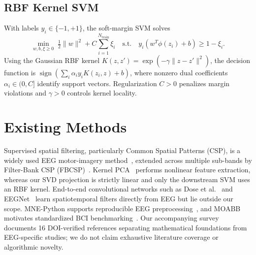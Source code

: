 \documentclass[conference]{IEEEtran}
\begin{document}
\subsection{RBF Kernel SVM}
With labels $y_i\in\{-1,+1\}$, the soft-margin SVM solves~\cite{ref7,ref8}
\begin{equation}
\min_{w,b,\xi\geq 0}\;\tfrac12\|w\|^2+C\sum_{i=1}^{N_{\text{train}}}\xi_i
\quad\text{s.t.}\quad y_i(w^T\phi(z_i)+b)\geq 1-\xi_i.
\end{equation}
Using the Gaussian RBF kernel $K(z,z')=\exp(-\gamma\|z-z'\|^2)$, the decision
function is $\operatorname{sign}\!\left(\sum_i\alpha_i y_i K(z_i,z)+b\right)$,
where nonzero dual coefficients $\alpha_i\in(0,C]$ identify support vectors.
Regularization $C>0$ penalizes margin violations and $\gamma>0$ controls kernel
locality.

\section{Existing Methods}
Supervised spatial filtering, particularly Common Spatial Patterns (CSP), is a
widely used EEG motor-imagery method~\cite{ref4,ref5}, extended across multiple
sub-bands by Filter-Bank CSP (FBCSP)~\cite{ref6}. Kernel PCA~\cite{ref9} performs
nonlinear feature extraction, whereas our SVD projection is strictly linear and
only the downstream SVM uses an RBF kernel. End-to-end convolutional networks
such as Dose et al.~\cite{ref14} and EEGNet~\cite{ref15} learn spatiotemporal
filters directly from EEG but lie outside our scope. MNE-Python supports
reproducible EEG preprocessing~\cite{ref2}, and MOABB motivates standardized BCI
benchmarking~\cite{ref16}. Our accompanying survey documents 16 DOI-verified
references separating mathematical foundations from EEG-specific studies; we do
not claim exhaustive literature coverage or algorithmic novelty.
\end{document}
